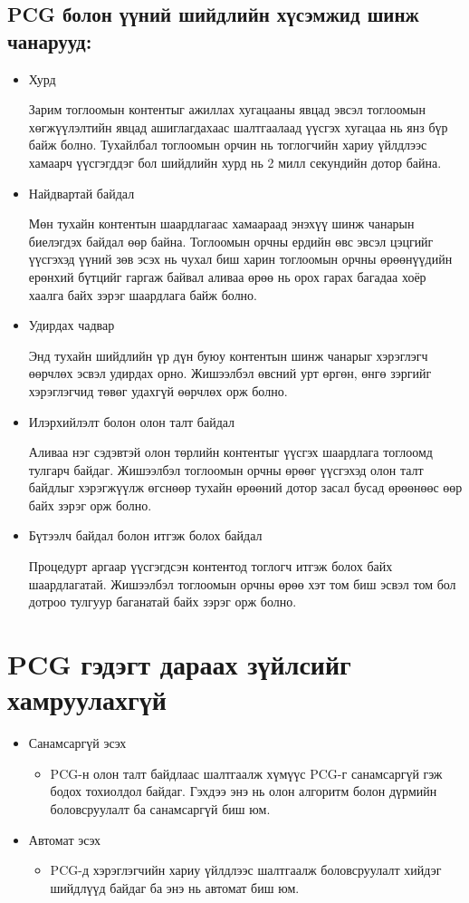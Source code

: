 \subsection{PCG болон үүний шийдлийн хүсэмжид шинж чанарууд\cite{PCGinGames2016}:}
\begin{itemize}
	\item Хурд

	      Зарим тоглоомын контентыг ажиллах хугацааны явцад эвсэл тоглоомын хөгжүүлэлтийн явцад ашиглагдахаас шалтгаалаад үүсгэх хугацаа нь янз бүр байж болно. Тухайлбал тоглоомын орчин нь тоглогчийн хариу үйлдлээс хамаарч үүсгэгддэг бол шийдлийн хурд нь 2 милл секундийн дотор байна.
	\item Найдвартай байдал

	      Мөн тухайн контентын шаардлагаас хамаараад энэхүү шинж чанарын биелэгдэх байдал өөр байна. Тоглоомын орчны ердийн өвс эвсэл цэцгийг үүсгэхэд үүний зөв эсэх нь чухал биш харин тоглоомын орчны өрөөнүүдийн ерөнхий бүтцийг гаргаж байвал аливаа өрөө нь орох гарах багадаа хоёр хаалга байх зэрэг шаардлага байж болно.
	\item Удирдах чадвар

	      Энд тухайн шийдлийн үр дүн буюу контентын шинж чанарыг хэрэглэгч өөрчлөх эсвэл удирдах орно. Жишээлбэл өвсний урт өргөн, өнгө зэргийг хэрэглэгчид төвөг удахгүй өөрчлөх орж болно.
	\item Илэрхийлэлт болон олон талт байдал

	      Аливаа нэг сэдэвтэй олон төрлийн контентыг үүсгэх шаардлага тоглоомд тулгарч байдаг. Жишээлбэл тоглоомын орчны өрөөг үүсгэхэд олон талт байдлыг хэрэгжүүлж өгснөөр тухайн өрөөний дотор засал бусад өрөөнөөс өөр байх зэрэг орж болно.
	\item Бүтээлч байдал болон итгэж болох байдал

	      Процедурт аргаар үүсгэгдсэн контентод тоглогч итгэж болох байх шаардлагатай. Жишээлбэл тоглоомын орчны өрөө хэт том биш эсвэл том бол дотроо тулгуур баганатай байх зэрэг орж болно.
\end{itemize}

\section{PCG гэдэгт дараах зүйлсийг хамруулахгүй}
\begin{itemize}
	\item Санамсаргүй эсэх
	      \begin{itemize}
		      \item PCG-н олон талт байдлаас шалтгаалж хүмүүс PCG-г санамсаргүй гэж бодох тохиолдол байдаг. Гэхдээ энэ нь олон алгоритм болон дүрмийн боловсруулалт ба санамсаргүй биш юм.
	      \end{itemize}
	\item Автомат эсэх
	      \begin{itemize}
		      \item PCG-д хэрэглэгчийн хариу үйлдлээс шалтгаалж боловсруулалт хийдэг шийдлүүд байдаг ба энэ нь автомат биш юм.
	      \end{itemize}
\end{itemize}

